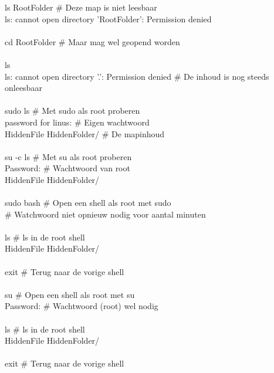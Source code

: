 \begin{bash}
\userprompt[~/Folder] ls RootFolder                         \# Deze map is niet leesbaar\\
ls: cannot open directory 'RootFolder': Permission denied\\
\\
\userprompt[~/Folder] cd RootFolder                         \# Maar mag wel geopend worden\\
\\
 ls\\
ls: cannot open directory '.': Permission denied           \# De inhoud is nog steeds onleesbaar\\
\\
 sudo ls                    \# Met sudo als root proberen\\
[sudo] password for linus:                                   \# Eigen wachtwoord\\
HiddenFile HiddenFolder/                                   \# De mapinhoud\\
\\
 su -c ls                   \# Met su als root proberen\\
Password:                                                  \# Wachtwoord van root\\
HiddenFile HiddenFolder/\\
\\
 sudo bash                  \# Open een shell als root met sudo\\
\# Watchwoord niet opnieuw nodig voor aantal minuten\\
\\
 ls                \# ls in de root shell\\
HiddenFile HiddenFolder/\\
\\
 exit              \# Terug naar de vorige shell\\
\\
 su                         \# Open een shell als root met su\\
Password:                                                  \# Wachtwoord (root) wel nodig\\
\\
 ls                \# ls in de root shell\\
HiddenFile HiddenFolder/\\
\\
 exit              \# Terug naar de vorige shell\\
\end{bash}

